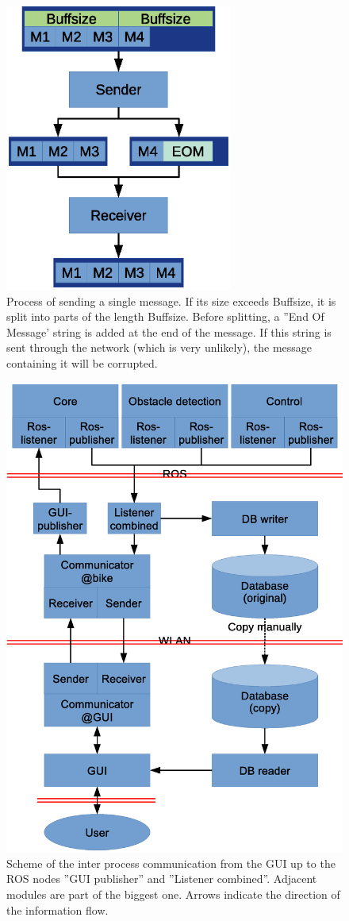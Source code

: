 \documentclass[]{scrreprt}
\begin{document}
	\begin{figure}[H]
		\centering
		\includegraphics[width=7.5cm]{images/sendSingleMsg.eps}
		\caption[Send a single message]{Process of sending a single message. If its size exceeds Buffsize, it is split into parts of the length Buffsize. Before splitting, a ''End Of Message' string is added at the end of the message. If this string is sent through the network (which is very unlikely), the message containing it will be corrupted.}
	\end{figure}
	
	\begin{figure}[H]
		\centering
		\includegraphics[width=0.8\linewidth]{images/communication2.eps}
		\caption[Communication]{Scheme of the inter process communication from the GUI up to the ROS nodes ''GUI publisher'' and ''Listener combined''. Adjacent modules are part of the biggest one. Arrows indicate the direction of the information flow. }
		\label{fig:communication}
	\end{figure}
\end{document}
